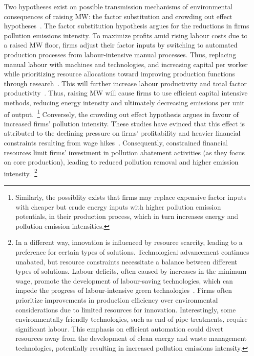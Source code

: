 \documentclass{C:/Users/david/OneDrive/Documents/ULMS/PhD/Thesis/chapter3/src/climate_change/latex/Economic_Journal/OUP-EJ}
\begin{document}
    Two hypotheses exist on possible transmission mechanisms of environmental consequences of raising MW: the factor substitution and crowding out effect hypotheses~\citep{zhang2023unintended}. The factor substitution hypothesis argues for the reductions in firms pollution emissions intensity. To maximize profits amid rising labour costs due to a raised MW floor, firms adjust their factor inputs by switching to automated production processes from labour-intensive manual processes. Thus, replacing manual labour with machines and technologies, and increasing capital per worker while prioritizing resource allocations toward improving production functions through research~\citep{harasztosi2019pays,hau2020firm, geng2022minimum,dai2023minimum, li2020labor}. This will further increase labour productivity and total factor productivity~\citep{riley2017raising}. Thus, raising MW will cause firms to use efficient capital intensive methods, reducing energy intensity and ultimately decreasing emissions per unit of output.~\footnote{\tiny Similarly, the possiblity exists that firms may replace expensive factor inputs with cheaper but crude energy inputs with higher pollution emission potentials, in their production process, which in turn increases energy and pollution emission intensities.} Conversely, the crowding out effect hypothesis argues in favour of increased firms' pollution intensity. These studies have evinced that this effect is attributed to the declining pressure on firms' profitability and heavier financial constraints resulting from wage hikes~\citep{draca2011minimum, bell2018minimum, du2022minimum}. Consequently, constrained financial resources limit firms' investment in pollution abatement activities (as they focus on core production), leading to reduced pollution removal and higher emission intensity.~\footnote{\tiny In a different way, innovation is influenced by resource scarcity, leading to a preference for certain types of solutions. Technological advancement continues unabated, but resource constraints necessitate a balance between different types of solutions. Labour deficits, often caused by increases in the minimum wage, promote the development of labour-saving technologies, which can impede the progress of labour-intensive green technologies~\citep{acemoglu2010does}. Firms often prioritize improvements in production efficiency over environmental considerations due to limited resources for innovation. Interestingly, some environmentally friendly technologies, such as end-of-pipe treatments, require significant labour. This emphasis on efficient automation could divert resources away from the development of clean energy and waste management technologies, potentially resulting in increased pollution emissions intensity.}
\end{document}

